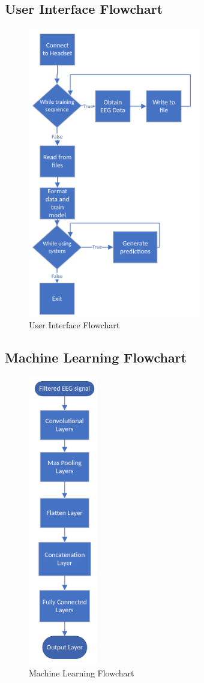 \documentclass[conference]{IEEEtran}
\begin{document}
\subsection{User Interface Flowchart}
\begin{figure}[h]
    \centering
    \includegraphics[keepaspectratio, height=5in]{figs/H/ui_flowchart.png}
    \caption{User Interface Flowchart}
    \label{fig:ui_flow}
\end{figure}
\newpage
\subsection{Machine Learning Flowchart}
\begin{figure}[h]
    \centering
    \includegraphics[keepaspectratio, height=5in]{figs/H/ml_flowchart.png}
    \caption{Machine Learning Flowchart}
    \label{fig:ml_flow}
\end{figure}
\end{document}
